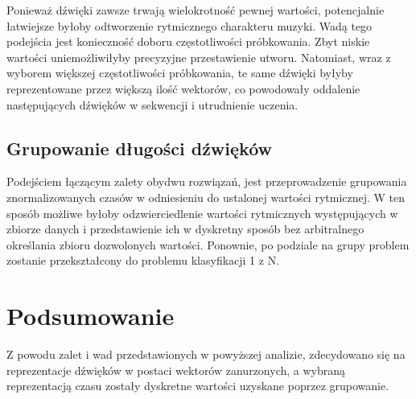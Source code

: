 {{{            Ponieważ dźwięki zawsze trwają wielokrotność pewnej wartości, potencjalnie łatwiejsze byłoby 
            odtworzenie rytmicznego charakteru muzyki.
            Wadą tego podejścia jest konieczność doboru częstotliwości próbkowania. Zbyt niskie wartości 
            uniemożliwiłyby precyzyjne przestawienie utworu. Natomiast, wraz z wyborem większej częstotliwości próbkowania,
            te same dźwięki byłyby reprezentowane przez większą ilość wektorów, 
            co powodowały oddalenie następujących dźwięków w sekwencji i utrudnienie uczenia.
        }

        \subsection{Grupowanie długości dźwięków}
        {
            Podejściem łączącym zalety obydwu rozwiązań, jest przeprowadzenie grupowania znormalizowanych czasów w
            odniesieniu do ustalonej wartości rytmicznej. W ten sposób możliwe byłoby odzwierciedlenie wartości rytmicznych
            występujących w zbiorze danych i przedstawienie ich w dyskretny sposób bez arbitralnego określania zbioru dozwolonych
            wartości. 
            Ponownie, po podziale na grupy problem zostanie przekształcony do problemu klasyfikacji 1 z N.
        }
    }

    \section{Podsumowanie}
    {
        Z powodu zalet i wad przedstawionych w powyższej analizie, zdecydowano się na reprezentacje dźwięków w postaci
        wektorów zanurzonych, a wybraną reprezentacją czasu zostały dyskretne wartości uzyskane poprzez grupowanie.
    }
}
